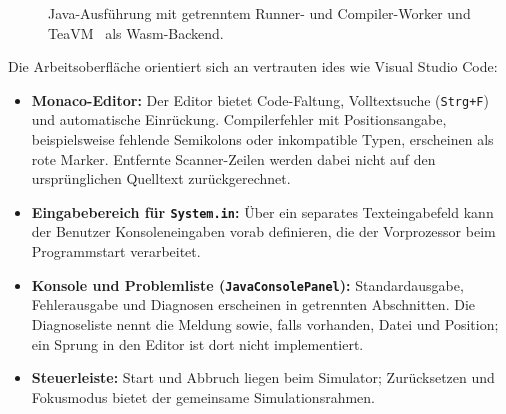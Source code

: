 \begin{figure}[H]
  \centering
  \caption[Java-Ausführung mit zwei Workern]{Java-Ausführung mit getrenntem Runner- und Compiler-Worker und TeaVM~\cite{teavm} als Wasm-Backend.}
  \label{fig:java_worker_ablauf}
\end{figure}


Die Arbeitsoberfläche orientiert sich an vertrauten \glspl{ide} wie Visual Studio Code:
\begin{itemize}
  \item \textbf{Monaco-Editor:} Der Editor bietet Code-Faltung, Volltextsuche (\texttt{Strg+F}) und automatische Einrückung. Compilerfehler mit Positionsangabe, beispielsweise fehlende Semikolons oder inkompatible Typen, erscheinen als rote Marker. Entfernte Scanner-Zeilen werden dabei nicht auf den ursprünglichen Quelltext zurückgerechnet.
  \item \textbf{Eingabebereich für \texttt{System.in}:} Über ein separates Texteingabefeld kann der Benutzer Konsoleneingaben vorab definieren, die der Vorprozessor beim Programmstart verarbeitet.
  \item \textbf{Konsole und Problemliste (\texttt{JavaConsolePanel}):} Standardausgabe, Fehlerausgabe und Diagnosen erscheinen in getrennten Abschnitten. Die Diagnoseliste nennt die Meldung sowie, falls vorhanden, Datei und Position; ein Sprung in den Editor ist dort nicht implementiert.
  \item \textbf{Steuerleiste:} Start und Abbruch liegen beim Simulator; Zurücksetzen und Fokusmodus bietet der gemeinsame Simulationsrahmen.
\end{itemize}

